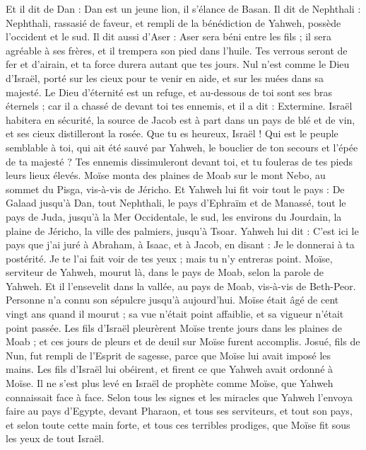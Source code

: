 \begin{multicols}{2}
Et il dit de Dan : Dan est un jeune lion, il s'élance de Basan.
Il dit de Nephthali : Nephthali, rassasié de faveur, et rempli de la bénédiction de Yahweh, possède l'occident et le sud.
Il dit aussi d'Aser : Aser sera béni entre les fils ; il sera agréable à ses frères, et il trempera son pied dans l'huile.
Tes verrous seront de fer et d'airain, et ta force durera autant que tes jours.
Nul n'est comme le Dieu d'Israël, porté sur les cieux pour te venir en aide, et sur les nuées dans sa majesté.
Le Dieu d'éternité est un refuge, et au-dessous de toi sont ses bras éternels ; car il a chassé de devant toi tes ennemis, et il a dit : Extermine.
Israël habitera en sécurité, la source de Jacob est à part dans un pays de blé et de vin, et ses cieux distilleront la rosée.
Que tu es heureux, Israël ! Qui est le peuple semblable à toi, qui ait été sauvé par Yahweh, le bouclier de ton secours et l'épée de ta majesté ? Tes ennemis dissimuleront devant toi, et tu fouleras de tes pieds leurs lieux élevés.
\VerseOne{}Moïse monta des plaines de Moab sur le mont Nebo, au sommet du Pisga, vis-à-vis de Jéricho. Et Yahweh lui fit voir tout le pays : De Galaad jusqu'à Dan,
tout Nephthali, le pays d'Ephraïm et de Manassé, tout le pays de Juda, jusqu'à la Mer Occidentale,
le sud, les environs du Jourdain, la plaine de Jéricho, la ville des palmiers, jusqu'à Tsoar.
Yahweh lui dit : C'est ici le pays que j'ai juré à Abraham, à Isaac, et à Jacob, en disant : Je le donnerai à ta postérité. Je te l'ai fait voir de tes yeux ; mais tu n'y entreras point.
Moïse, serviteur de Yahweh, mourut là, dans le pays de Moab, selon la parole de Yahweh.
Et il l'ensevelit dans la vallée, au pays de Moab, vis-à-vis de Beth-Peor. Personne n'a connu son sépulcre jusqu'à aujourd'hui.
Moïse était âgé de cent vingt ans quand il mourut ; sa vue n'était point affaiblie, et sa vigueur n'était point passée.
Les fils d'Israël pleurèrent Moïse trente jours dans les plaines de Moab ; et ces jours de pleurs et de deuil sur Moïse furent accomplis.
Josué, fils de Nun, fut rempli de l'Esprit de sagesse, parce que Moïse lui avait imposé les mains. Les fils d'Israël lui obéirent, et firent ce que Yahweh avait ordonné à Moïse.
Il ne s'est plus levé en Israël de prophète comme Moïse, que Yahweh connaissait face à face.
Selon tous les signes et les miracles que Yahweh l'envoya faire au pays d'Egypte, devant Pharaon, et tous ses serviteurs, et tout son pays,
et selon toute cette main forte, et tous ces terribles prodiges, que Moïse fit sous les yeux de tout Israël.
\PPE{}
\end{multicols}
